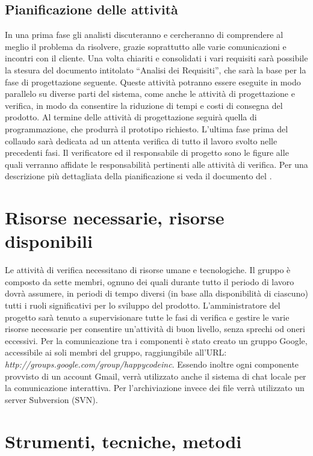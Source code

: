 \documentclass[11pt,titlepage,a4paper]{report}
\begin{document}
\subsection{Pianificazione delle attivit\`a}
In una prima fase gli analisti discuteranno e cercheranno di comprendere al meglio il problema da risolvere, grazie soprattutto alle varie comunicazioni e incontri con il cliente. Una volta chiariti e consolidati i vari requisiti sar\`a possibile la stesura del documento intitolato ``Analisi dei Requisiti'', che sar\`a la base per la fase di progettazione seguente. Queste attivit\`a potranno essere eseguite in modo parallelo su diverse parti del sistema, come anche le attivit\`a di progettazione e verifica, in modo da consentire la riduzione di tempi e costi di consegna del prodotto. Al termine delle attivit\`a di progettazione seguir\`a quella di programmazione, che produrr\`a il prototipo richiesto. L'ultima fase prima del collaudo sar\`a dedicata ad un attenta verifica di tutto il lavoro svolto nelle precedenti fasi. Il verificatore ed il responsabile di progetto sono le figure alle quali verranno affidate le responsabilit\`a pertinenti alle attivit\`a di verifica. Per una descrizione pi\`u dettagliata della pianificazione si veda il documento del \PianoDiProgetto .

\section{Risorse necessarie, risorse disponibili}
Le attivit\`a di verifica necessitano di risorse umane e tecnologiche. Il gruppo \`e composto da sette membri, ognuno dei quali durante tutto il periodo di lavoro dovr\`a assumere, in periodi di tempo diversi (in base alla disponibilit\`a di ciascuno) tutti i ruoli significativi per lo sviluppo del prodotto. L'amministratore del progetto sar\`a tenuto a supervisionare tutte le fasi di verifica e gestire le varie risorse necessarie per consentire un'attivit\`a di buon livello, senza sprechi od oneri eccessivi. Per la comunicazione tra i componenti \`e stato creato un gruppo Google, accessibile ai soli membri del gruppo, raggiungibile all'URL: \textit{http://groups.google.com/group/happycodeinc}. Essendo inoltre ogni componente provvisto di un account Gmail, verr\`a utilizzato anche il sistema di chat locale per la comunicazione interattiva. Per l'archiviazione invece dei file verr\`a utilizzato un server Subversion (SVN).

\section{Strumenti, tecniche, metodi}
\end{document}
